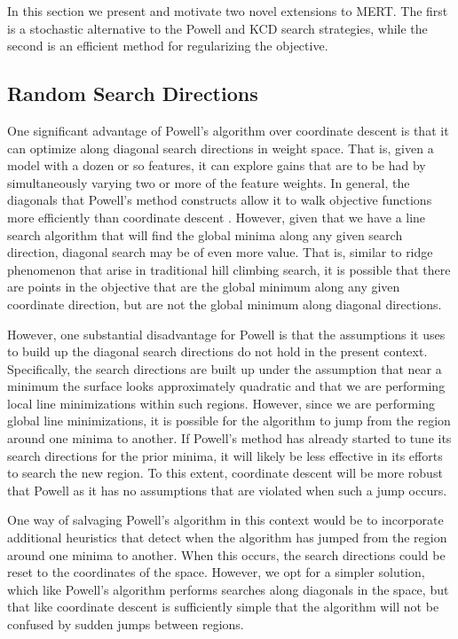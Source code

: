 \documentclass[11pt]{article}
\begin{document}
In this section we present and motivate two novel extensions to MERT. The first is a stochastic alternative to the Powell and KCD search strategies, while the second is an efficient method for regularizing the objective.

\subsection{Random Search Directions}

One significant advantage of Powell's algorithm over coordinate descent is that it can optimize along diagonal search directions in weight space. That is, given a model with a dozen or so features, it can explore gains that are to be had by simultaneously varying two or more of the feature weights. In general, the diagonals that Powell's method constructs allow it to walk objective functions more efficiently than coordinate descent \cite{press2007}. However, given that we have a line search algorithm that will find the global minima along any given search direction, diagonal search may be of even more value. That is, similar to ridge phenomenon that arise in traditional hill climbing search, it is possible that there are points in the objective that are the global minimum along any given coordinate direction, but are not the global minimum along diagonal directions.  

However, one substantial disadvantage for Powell is that the assumptions it uses to build up the diagonal search directions do not hold in the present context. Specifically, the search directions are built up under the assumption that near a minimum the surface looks approximately quadratic and that we are performing local line minimizations within such regions. However, since we are performing global line minimizations, it is possible for the algorithm to jump from the region around one minima to another. If Powell's method has already started to tune its search directions for the prior minima, it will likely be less effective in its efforts to search the new region. To this extent, coordinate descent will be more robust that Powell as it has no assumptions that are violated when such a jump occurs. 

One way of salvaging Powell's algorithm in this context would be to incorporate additional heuristics that detect when the algorithm has jumped from the region around one minima to another. When this occurs, the search directions could be reset to the coordinates of the space. However, we opt for a simpler solution, which like Powell's algorithm performs searches along diagonals in the space, but that like coordinate descent is sufficiently simple that the algorithm will not be confused by sudden jumps between regions. 
\end{document}

